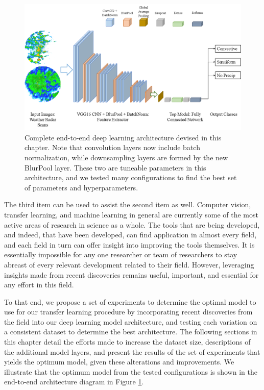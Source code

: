 \begin{figure}[h]
	\centering
	\includegraphics[width=\textwidth]{./thesis_code/plots/DL-workflow.png}
	\caption{Complete end-to-end deep learning architecture devised in this chapter. Note that convolution layers now include batch normalization, while downsampling layers are formed by the new BlurPool layer. These two are tuneable parameters in this architecture, and we tested many configurations to find the best set of parameters and hyperparameters.}
	\label{fig:end-to-end}
\end{figure}

The third item can be used to assist the second item as well. Computer vision, transfer learning, and machine learning in general are currently some of the most active areas of research in science as a whole.
The tools that are being developed, and indeed, that have been developed, can find application in almost every field, and each field in turn can offer insight into improving the tools themselves.
It is essentially impossible for any one researcher or team of researchers to stay abreast of every relevant development related to their field.
However, leveraging insights made from recent discoveries remains useful, important, and essential for any effort in this field.

To that end, we propose a set of experiments to determine the optimal model to use for our transfer learning procedure by incorporating recent discoveries from the field into our deep learning model architecture, and testing each variation on a consistent dataset to determine the best architecture.
The following sections in this chapter detail the efforts made to increase the dataset size, descriptions of the additional model layers, and present the results of the set of experiments that yields the optimum model, given these alterations and improvements.
We illustrate that the optimum model from the tested configurations is shown in the end-to-end architecture diagram in Figure \ref{fig:end-to-end}.

